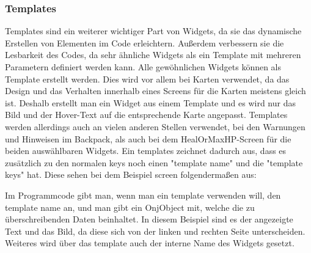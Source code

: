 \subsubsection{Templates}\label{sec:templates}
\renewcommand{\kapitelautor}{Autor: Felix Zwickelstorfer}
Templates sind ein weiterer wichtiger Part von Widgets, da sie das dynamische Erstellen von Elementen im Code erleichtern.
Außerdem verbessern sie die Lesbarkeit des Codes, da sehr ähnliche Widgets als ein Template mit mehreren Parametern definiert werden kann.
Alle gewöhnlichen Widgets können als Template erstellt werden.
Dies wird vor allem bei Karten verwendet, da das Design und das Verhalten innerhalb eines Screens für die Karten meistens gleich ist.
Deshalb erstellt man ein Widget aus einem Template und es wird nur das Bild und der Hover-Text auf die entsprechende Karte angepasst.
Templates werden allerdings auch an vielen anderen Stellen verwendet, \zB bei den Warnungen und Hinweisen im Backpack, als auch bei dem HealOrMaxHP-Screen für die beiden auswählbaren Widgets.
Ein templates zeichnet dadurch aus, dass es zusätzlich zu den normalen keys noch einen "template name" und die "template keys" hat.
Diese sehen bei dem Beispiel screen folgendermaßen aus:
Im Programmcode gibt man, wenn man ein template verwenden will, den template name an, und man gibt ein OnjObject mit, welche die zu überschreibenden Daten beinhaltet.
In diesem Beispiel sind es der angezeigte Text und das Bild, da diese sich von der linken und rechten Seite unterscheiden.
Weiteres wird über das template auch der interne Name des Widgets gesetzt.

